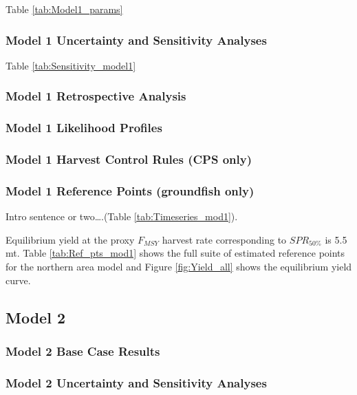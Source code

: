 \documentclass[12pt,]{article}
\begin{document}
Table \ref{tab:Model1_params}

\subsubsection{Model 1 Uncertainty and Sensitivity
Analyses}\label{model-1-uncertainty-and-sensitivity-analyses}

Table \ref{tab:Sensitivity_model1}

\subsubsection{Model 1 Retrospective
Analysis}\label{model-1-retrospective-analysis}

\subsubsection{Model 1 Likelihood
Profiles}\label{model-1-likelihood-profiles}

\subsubsection{Model 1 Harvest Control Rules (CPS
only)}\label{model-1-harvest-control-rules-cps-only}

\subsubsection{Model 1 Reference Points (groundfish
only)}\label{model-1-reference-points-groundfish-only}

Intro sentence or two\ldots{}.(Table \ref{tab:Timeseries_mod1}).

Equilibrium yield at the proxy \(F_{MSY}\) harvest rate corresponding to
\(SPR_{50\%}\) is 5.5 mt. Table \ref{tab:Ref_pts_mod1} shows the full
suite of estimated reference points for the northern area model and
Figure \ref{fig:Yield_all} shows the equilibrium yield curve.

\subsection{Model 2}\label{model-2}

\subsubsection{Model 2 Base Case
Results}\label{model-2-base-case-results}

\subsubsection{Model 2 Uncertainty and Sensitivity
Analyses}\label{model-2-uncertainty-and-sensitivity-analyses}
\end{document}
